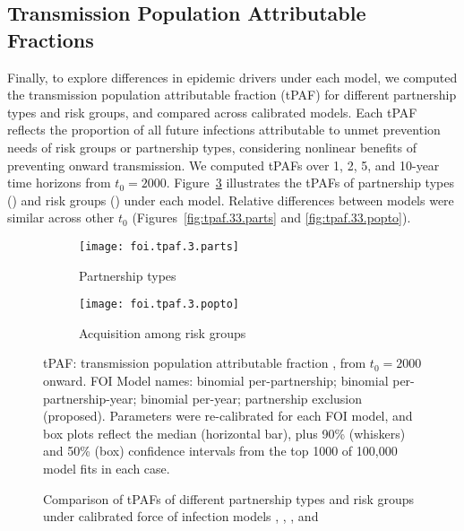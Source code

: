 \subsection{Transmission Population Attributable Fractions}\label{exp.tpaf}
Finally, to explore differences in epidemic drivers under each model,
we computed the transmission population attributable fraction (tPAF) \cite{Mishra2014}
for different partnership types and risk groups,
and compared across calibrated models.
Each tPAF reflects the proportion of all future infections attributable to
unmet prevention needs of risk groups or partnership types,
considering nonlinear benefits of preventing onward transmission.
We computed tPAFs over 1, 2, 5, and 10-year time horizons from $t_0 = 2000$.
Figure~\ref{fig:tpaf.3} illustrates the tPAFs of
partnership types () and risk groups ()
under each model.
Relative differences between models were similar across other $t_0$
(Figures~\ref{fig:tpaf.33.parts} and \ref{fig:tpaf.33.popto}).
\begin{figure}[h]
  \begin{subfigure}{\linewidth}
    \centerline{\texttt{[image: foi.tpaf.3.parts]}}
    \caption{Partnership types}
    \label{fig:tpaf.3.parts}
  \end{subfigure}
  \begin{subfigure}{\linewidth}
    \centerline{\texttt{[image: foi.tpaf.3.popto]}}
    \caption{Acquisition among risk groups}
    \label{fig:tpaf.3.popto}
  \end{subfigure}
  \caption{Comparison of tPAFs of different partnership types and risk groups
    under calibrated force of infection models , , , and }
  \label{fig:tpaf.3}
  \floatfoot
  tPAF: transmission population attributable fraction \cite{Mishra2014}, from $t_0 = 2000$ onward.
  FOI Model names:
   binomial per-partnership;
   binomial per-partnership-year;
   binomial per-year;
   partnership exclusion (proposed).
  Parameters were re-calibrated for each FOI model,
  and box plots reflect the median (horizontal bar),
  plus 90\% (whiskers) and 50\% (box) confidence intervals from
  the top 1000 of 100,000 model fits in each case.
\end{figure}